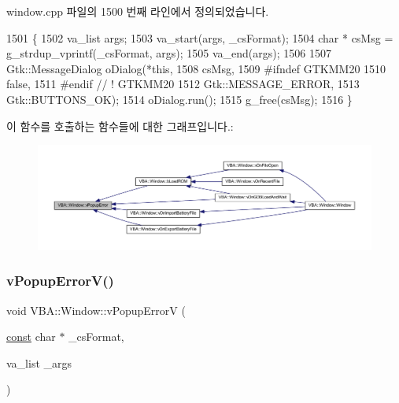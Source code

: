 window.\+cpp 파일의 1500 번째 라인에서 정의되었습니다.


\begin{DoxyCode}
1501 \{
1502   va\_list args;
1503   va\_start(args, \_csFormat);
1504   \textcolor{keywordtype}{char} * csMsg = g\_strdup\_vprintf(\_csFormat, args);
1505   va\_end(args);
1506 
1507   Gtk::MessageDialog oDialog(*\textcolor{keyword}{this},
1508                              csMsg,
1509 #ifndef GTKMM20
1510                              \textcolor{keyword}{false},
1511 #endif \textcolor{comment}{// ! GTKMM20}
1512                              Gtk::MESSAGE\_ERROR,
1513                              Gtk::BUTTONS\_OK);
1514   oDialog.run();
1515   g\_free(csMsg);
1516 \}
\end{DoxyCode}
이 함수를 호출하는 함수들에 대한 그래프입니다.\+:
\nopagebreak
\begin{figure}[H]
\begin{center}
\leavevmode
\includegraphics[width=350pt]{class_v_b_a_1_1_window_afde18894816458e195f561b03ee2898c_icgraph}
\end{center}
\end{figure}
\mbox{\label{class_v_b_a_1_1_window_a1f89a108839ea022393c56782dde0f60}} 
\subsubsection{\texorpdfstring{v\+Popup\+Error\+V()}{vPopupErrorV()}}
{\footnotesize\ttfamily void V\+B\+A\+::\+Window\+::v\+Popup\+ErrorV (\begin{DoxyParamCaption}\item[{\mbox{\hyperlink{getopt1_8c_a2c212835823e3c54a8ab6d95c652660e}{const}} char $\ast$}]{\+\_\+cs\+Format,  }\item[{va\+\_\+list}]{\+\_\+args }\end{DoxyParamCaption})}




